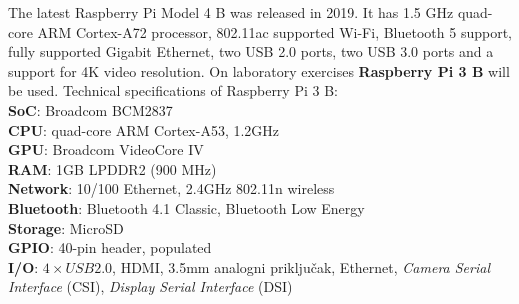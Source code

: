 \documentclass[11pt]{article}
\begin{document}
The latest Raspberry Pi Model 4 B was released in 2019. It has 1.5 GHz
 quad-core ARM Cortex-A72 processor, 802.11ac supported Wi-Fi,
 Bluetooth 5 support, fully supported Gigabit Ethernet, two USB 2.0 ports, two
 USB 3.0 ports and a support for 4K video resolution.
\newline
\newline
On laboratory exercises \textbf{Raspberry Pi 3 B} will be used.
\newline
\newline
Technical specifications of Raspberry Pi 3 B: \\
\textbf{SoC}: Broadcom BCM2837 \\
\textbf{CPU}: quad-core ARM Cortex-A53, 1.2GHz \\
\textbf{GPU}: Broadcom VideoCore IV \\
\textbf{RAM}: 1GB LPDDR2 (900 MHz) \\
\textbf{Network}: 10/100 Ethernet, 2.4GHz 802.11n wireless \\
\textbf{Bluetooth}: Bluetooth 4.1 Classic, Bluetooth Low Energy \\
\textbf{Storage}: MicroSD \\
\textbf{GPIO}: 40-pin header, populated \\
\textbf{I/O}: $4\times USB 2.0$, HDMI, 3.5mm analogni priključak,
 Ethernet, \textit{Camera Serial Interface} (CSI), \textit{Display Serial
 Interface} (DSI)
\end{document}
